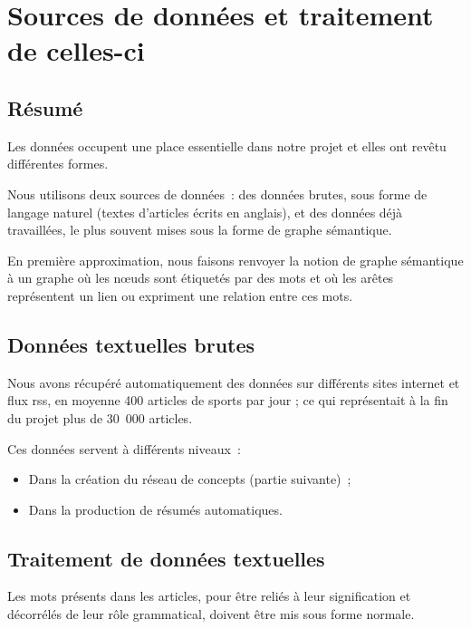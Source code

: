 \documentclass[a4paper, 12pt]{article}
\begin{document}
\section{Sources de données et traitement de celles-ci}

\subsection{Résumé}

Les données occupent une place essentielle dans notre projet et elles ont revêtu différentes formes.

Nous utilisons deux sources de données~: des données brutes, sous forme de langage naturel (textes d'articles écrits en anglais), et des données déjà travaillées, le plus souvent mises sous la forme de graphe sémantique.

\begin{definition}
En première approximation, nous faisons renvoyer la notion de graphe sémantique à un graphe où les nœuds sont étiquetés par des mots et où les arêtes représentent un lien ou expriment une relation entre ces mots.
\end{definition}


\subsection{Données textuelles brutes}

Nous avons récupéré automatiquement des données sur différents sites internet et flux rss, en moyenne 400 articles de sports par jour ; ce qui représentait à la fin du projet plus de 30~000 articles.

Ces données servent à différents niveaux~:
\begin{itemize}
 \item Dans la création du réseau de concepts (partie suivante)~;
 \item Dans la production de résumés automatiques.
\end{itemize}



\subsection{Traitement de données textuelles}

Les mots présents dans les articles, pour être reliés à leur signification et décorrélés de leur rôle grammatical, doivent être mis sous forme normale.
\end{document}
